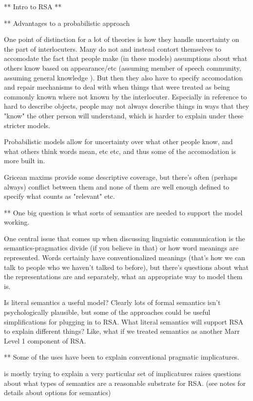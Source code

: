 \documentclass[]{article}
\begin{document}
** Intro to RSA ** 



** Advantages to a probabilistic approach

One point of distinction for a lot of theories is how they handle uncertainty on the part of interlocuters. Many do not and instead contort themselves to accomodate the fact that people make (in these models) assumptions about what others know based on appearance/etc (assuming member of speech community, assuming general knowledge ). But then they also have to specify accomodation and repair mechanisms to deal with when things that were treated as being commonly known where not known by the interlocuter. Especially in reference to hard to describe objects, people may not always describe things in ways that they "know" the other person will understand, which is harder to explain under these stricter models. 

Probabilistic models allow for uncertainty over what other people know, and what others think words mean, etc etc, and thus some of the accomodation is more built in. 

Gricean maxims provide some descriptive coverage, but there's often (perhaps always) conflict between them and none of them are well enough defined to specify what counts as "relevant" etc. 

** One big question is what sorts of semantics are needed to support the model working. 

One central issue that comes up when discussing linguistic communication is the semantics-pragmatics divide (if you believe in that) or how word meanings are represented. Words certainly have conventionalized meanings (that's how we can talk to people who we haven't talked to before), but there's questions about what the representations are and separately, what an appropriate way to model them is. 

Is literal semantics a useful model? Clearly lots of formal semantics isn't psychologically plausible, but some of the approaches could be useful simplifications for plugging in to RSA. What literal semantics will support RSA to explain different things? Like, what if we treated semantics as another Marr Level 1 component of RSA. 


** Some of the uses have been to explain conventional pragmatic implicatures. 

\cite{bergen} is mostly trying to explain a very particular set of implicatures raises questions about what types of semantics are a reasonable substrate for RSA. (see notes for details about options for semantics) 
\end{document}
